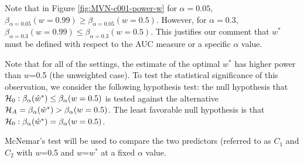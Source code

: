 \documentclass[12pt,oneside,final]{thesis}
\begin{document}
Note that in Figure \ref{fig:MVN-c001-power-w} for $\alpha=0.05$, $\beta_{\alpha=0.05}(w=0.99)\geq\beta_{\alpha=0.05}(w=0.5)$. However, for $\alpha=0.3$, $\beta_{\alpha=0.3}(w=0.99)\leq\beta_{\alpha=0.3}(w=0.5)$. This justifies our comment that  $w^{*}$  must be defined with respect to  the AUC measure or a specific $\alpha$ value.

Note that  for all of the settings, the estimate of the optimal $w^{*}$ has  higher power than $w$=0.5 (the unweighted case).
To test the statistical significance of this observation, we consider the following hypothesis test:  the null hypothesis that  $\mathcal{H}_{0}: \beta_{\alpha}({\hat{w}^*})\leq\beta_{\alpha}({w=0.5})$  is tested against the alternative $\mathcal{H}_{A}=\beta_{\alpha}({\hat{w}^*})>\beta_{\alpha}({w=0.5})$.  The least favorable null hypothesis is that  $\mathcal{H}_{0}: \beta_{\alpha}({\hat{w}^*})=\beta_{\alpha}({w=0.5})$.


McNemar's test will be used to compare the two predictors (referred to as $C_1$ and $C_2$ with $w$=0.5 and $w$=$w^*$ at a fixed $\alpha$ value.
\end{document}
